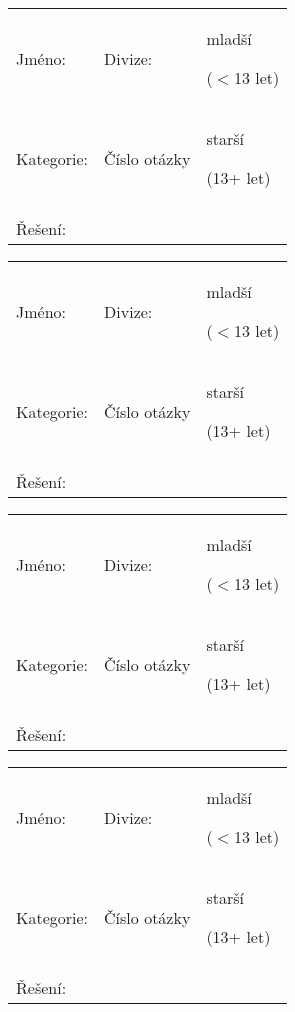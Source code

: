 \documentclass[a4paper, 10pt]{article}
\begin{document}
	\begin{minipage}{0.5\textwidth}
		\begin{table}[H]
			\ttfamily
			\begin{tabularx}{\textwidth}{XXX}
				Jméno: & Divize: & mladší
				
				($<$13 let)\\
				Kategorie: & Číslo otázky & starší
				
				(13+ let)\\
				&&\\
				Řešení: &&\\
				
			\end{tabularx}
		\end{table}
	\end{minipage}
	\begin{minipage}{0.5\textwidth}
		\begin{table}[H]
			\ttfamily
			\begin{tabularx}{\textwidth}{XXX}
				Jméno: & Divize: & mladší
				
				($<$13 let)\\
				Kategorie: & Číslo otázky & starší
				
				(13+ let)\\
				&&\\
				Řešení: &&\\
				
			\end{tabularx}
		\end{table}
	\end{minipage}

\begin{minipage}{0.5\textwidth}
	\begin{table}[H]
		\ttfamily
		\begin{tabularx}{\textwidth}{XXX}
			Jméno: & Divize: & mladší
			
			($<$13 let)\\
			Kategorie: & Číslo otázky & starší
			
			(13+ let)\\
			&&\\
			Řešení: &&\\
			
		\end{tabularx}
	\end{table}
\end{minipage}
\begin{minipage}{0.5\textwidth}
	\begin{table}[H]
		\ttfamily
		\begin{tabularx}{\textwidth}{XXX}
			Jméno: & Divize: & mladší
			
			($<$13 let)\\
			Kategorie: & Číslo otázky & starší
			
			(13+ let)\\
			&&\\
			Řešení: &&\\
			
		\end{tabularx}
	\end{table}
\end{minipage}
\end{document}
